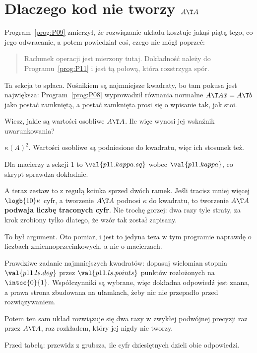 \section{Dlaczego kod nie tworzy \texorpdfstring{$A\T A$}{A transponowane A}}
\label{sec:P11-normal}

\begin{fr}
Program~\ref{prog:P09} zmierzył, że rozwiązanie układu kosztuje jakąś piątą
tego, co jego odwracanie, a potem powiedział coś, czego nie mógł poprzeć:

\begin{quote}
Rachunek operacji jest mierzony tutaj. Dokładność należy do
Programu~\ref{prog:P11} i jest tą połową, która rozstrzyga spór.
\end{quote}

Ta sekcja to spłaca. Nośnikiem są najmniejsze kwadraty, bo tam pokusa jest
największa: Program~\ref{prog:P08} wyprowadził równania normalne
$A\T A\hat{x} = A\T b$ jako postać zamkniętą, a postać zamknięta prosi się o
wpisanie tak, jak stoi.

Wiesz, jakie są wartości osobliwe $A\T A$. Ile więc wynosi jej wskaźnik
uwarunkowania?
\dotline
\nextframe
\end{fr}

\begin{fr}
\begin{ansblock}
$\kappa(A)^{2}$. Wartości osobliwe są podniesione do kwadratu, więc ich
stosunek też.
\end{ansblock}

Dla macierzy z sekcji 1 to $\val{p11.kappa.sq}$ wobec $\val{p11.kappa}$, co
skrypt sprawdza dokładnie.

A teraz zestaw to z regułą kciuka sprzed dwóch ramek. Jeśli tracisz mniej
więcej $\logb{10}\kappa$ cyfr, a tworzenie $A\T A$ podnosi $\kappa$ do
kwadratu, to tworzenie $A\T A$ \textbf{podwaja liczbę traconych cyfr}. Nie
trochę gorzej: dwa razy tyle straty, za krok zrobiony tylko dlatego, że wzór
tak został zapisany.
\end{fr}

\begin{fr}
To był argument. Oto pomiar, i jest to jedyna teza w tym programie naprawdę o
liczbach zmiennoprzecinkowych, a nie o macierzach.

Prawdziwe zadanie najmniejszych kwadratów: dopasuj wielomian stopnia
$\val{p11.ls.deg}$ przez $\val{p11.ls.points}$ punktów rozłożonych na
$\intcc{0}{1}$. Współczynniki są wybrane, więc dokładna odpowiedź jest znana, a
prawa strona zbudowana na ułamkach, żeby nic nie przepadło przed rozwiązywaniem.

Potem ten sam układ rozwiązuje się dwa razy w zwykłej podwójnej precyzji
\dash{} raz przez $A\T A$, raz rozkładem, który jej nigdy nie tworzy.

Przed tabelą: przewidz z grubsza, ile cyfr dziesiętnych dzieli obie
odpowiedzi.
\dotline
\nextframe
\end{fr}

